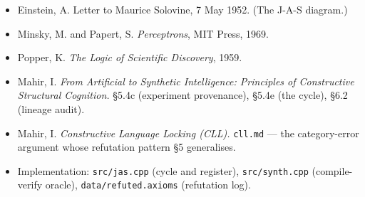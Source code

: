 \documentclass[
  11pt,
  a4paper,
]{article}
\providecommand{\tightlist}{%
  \setlength{\itemsep}{0pt}\setlength{\parskip}{0pt}}
\begin{document}
\begin{itemize}
\tightlist
\item
  Einstein, A. Letter to Maurice Solovine, 7 May 1952. (The J-A-S
  diagram.)
\item
  Minsky, M. and Papert, S. \emph{Perceptrons}, MIT Press, 1969.
\item
  Popper, K. \emph{The Logic of Scientific Discovery}, 1959.
\item
  Mahir, I. \emph{From Artificial to Synthetic Intelligence: Principles
  of Constructive Structural Cognition.} §5.4c (experiment provenance),
  §5.4e (the cycle), §6.2 (lineage audit).
\item
  Mahir, I. \emph{Constructive Language Locking (CLL).} \texttt{cll.md}
  --- the category-error argument whose refutation pattern §5
  generalises.
\item
  Implementation: \texttt{src/jas.cpp} (cycle and register),
  \texttt{src/synth.cpp} (compile-verify oracle),
  \texttt{data/refuted.axioms} (refutation log).
\end{itemize}
\end{document}
